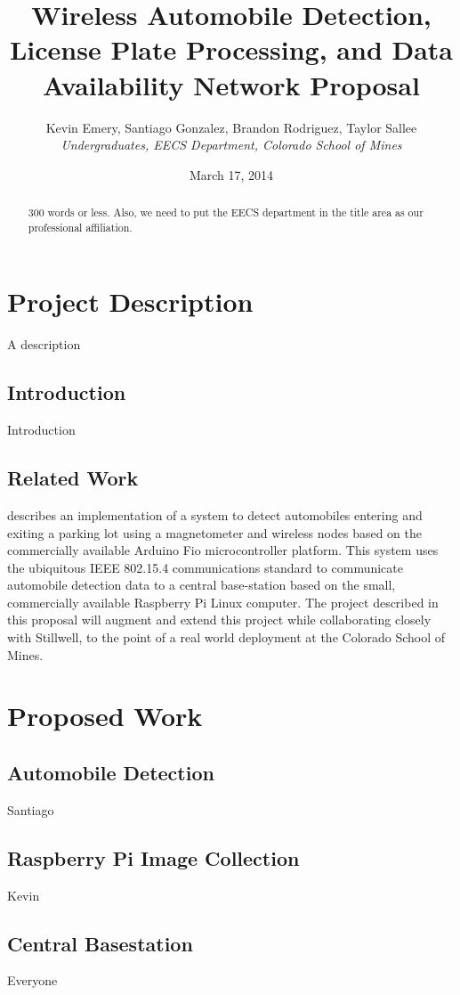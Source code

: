 \documentclass[11pt, oneside, fullpage, doublespace]{article}
\title{Wireless Automobile Detection, License Plate Processing, and Data Availability Network Proposal}
\author{Kevin Emery, Santiago Gonzalez, Brandon Rodriguez, Taylor Sallee\\ \emph{Undergraduates, EECS Department, Colorado School of Mines}}
\date{March 17, 2014}
\begin{document}
\maketitle

\begin{abstract}
300 words or less. Also, we need to put the EECS department in the title area as our professional affiliation.
\end{abstract}

\section{Project Description}
A description

\subsection{Introduction}
Introduction

\subsection{Related Work}
\cite{stillwell2013} describes an implementation of a system to detect automobiles entering and exiting a parking lot using a magnetometer and wireless nodes based on the commercially available Arduino Fio microcontroller platform. This system uses the ubiquitous IEEE 802.15.4 communications standard to communicate automobile detection data to a central base-station based on the small, commercially available Raspberry Pi Linux computer. The project described in this proposal will augment and extend this project while collaborating closely with Stillwell, to the point of a real world deployment at the Colorado School of Mines.

\section{Proposed Work}
\subsection{Automobile Detection}
Santiago
\subsection{Raspberry Pi Image Collection}
Kevin
\subsection{Central Basestation}
Everyone
\end{document}

